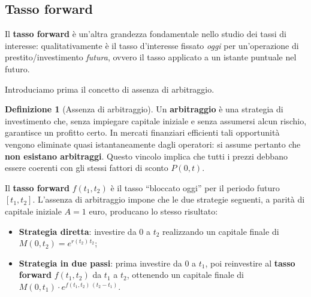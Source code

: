\documentclass[11pt,a4paper]{article}
\theoremstyle{plain}
\theoremstyle{definition}
\newtheorem{definizione}[teorema]{Definizione}
\theoremstyle{remark}
\begin{document}


\subsection{Tasso forward}

Il \textbf{tasso forward} \`e un'altra grandezza fondamentale nello studio dei tassi di
interesse: qualitativamente \`e il tasso d'interesse fissato \emph{oggi} per un'operazione di
prestito/investimento \emph{futura}, ovvero il tasso applicato a un istante
puntuale nel futuro. 

Introduciamo prima il concetto di assenza di arbitraggio.
\begin{definizione}[Assenza di arbitraggio]
\label{def:noarb}
Un \textbf{arbitraggio} \`e una strategia di investimento che, senza impiegare capitale
iniziale e senza assumersi alcun rischio, garantisce un profitto certo. In mercati
finanziari efficienti tali opportunit\`a vengono eliminate quasi istantaneamente dagli
operatori: si assume pertanto che \textbf{non esistano arbitraggi}. Questo vincolo implica
che tutti i prezzi debbano essere coerenti con gli stessi fattori di sconto $P(0,t)$.
\end{definizione}

Il \textbf{tasso forward} $f(t_1, t_2)$ \`e il tasso ``bloccato oggi'' per il periodo
futuro $[t_1, t_2]$. L'assenza di arbitraggio impone che le due strategie seguenti, a parit\`a
di capitale iniziale $A=1$ euro, producano lo stesso risultato:
\begin{itemize}
  \item \textbf{Strategia diretta}: investire da $0$ a $t_2$ realizzando un capitale finale di $M(0,t_2) = e^{r(t_2)\,t_2}$;
  \item \textbf{Strategia in due passi}: prima investire da $0$ a $t_1$, poi reinvestire al
        \textbf{tasso forward} $f(t_1,t_2)$ da $t_1$ a $t_2$, ottenendo un capitale finale di
        $M(0,t_1)\cdot e^{f(t_1,t_2)\,(t_2-t_1)}$.
\end{itemize}
\end{document}

